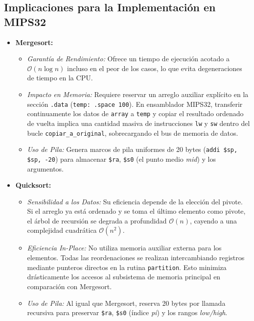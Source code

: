 \documentclass[12pt,a4paper]{article}
\begin{document}
	\subsection{Implicaciones para la Implementación en MIPS32}
	\begin{itemize}
		\item \textbf{Mergesort:}
		\begin{itemize}
			\item \textit{Garantía de Rendimiento:} Ofrece un tiempo de ejecución acotado a $\mathcal{O}(n \log n)$ incluso en el peor de los casos, lo que evita degeneraciones de tiempo en la CPU.
			\item \textit{Impacto en Memoria:} Requiere reservar un arreglo auxiliar explícito en la sección \texttt{.data} (\texttt{temp: .space 100}). En ensamblador MIPS32, transferir continuamente los datos de \texttt{array} a \texttt{temp} y copiar el resultado ordenado de vuelta implica una cantidad masiva de instrucciones \texttt{lw} y \texttt{sw} dentro del bucle \texttt{copiar\_a\_original}, sobrecargando el bus de memoria de datos.
			\item \textit{Uso de Pila:} Genera marcos de pila uniformes de 20 bytes (\texttt{addi \$sp, \$sp, -20}) para almacenar \texttt{\$ra}, \texttt{\$s0} (el punto medio \textit{mid}) y los argumentos.
		\end{itemize}
		\item \textbf{Quicksort:}
		\begin{itemize}
			\item \textit{Sensibilidad a los Datos:} Su eficiencia depende de la elección del pivote. Si el arreglo ya está ordenado y se toma el último elemento como pivote, el árbol de recursión se degrada a profundidad $\mathcal{O}(n)$, cayendo a una complejidad cuadrática $\mathcal{O}(n^2)$.
			\item \textit{Eficiencia In-Place:} No utiliza memoria auxiliar externa para los elementos. Todas las reordenaciones se realizan intercambiando registros mediante punteros directos en la rutina \texttt{partition}. Esto minimiza drásticamente los accesos al subsistema de memoria principal en comparación con Mergesort.
			\item \textit{Uso de Pila:} Al igual que Mergesort, reserva 20 bytes por llamada recursiva para preservar \texttt{\$ra}, \texttt{\$s0} (índice \textit{pi}) y los rangos \textit{low/high}.
		\end{itemize}
	\end{itemize}
	
\end{document}
